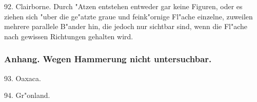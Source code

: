 \documentclass[a4paper, 11pt, oneside, polutonikogreek, german]{article}
\begin{document}
92. Clairborne. Durch "Atzen entstehen entweder gar keine Figuren, oder es ziehen sich "uber die ge"atzte graue und feink"ornige Fl"ache einzelne, zuweilen mehrere parallele B"ander hin, die jedoch nur sichtbar sind, wenn die Fl"ache nach gewissen Richtungen gehalten wird.

\subsubsection{Anhang. Wegen Hammerung nicht untersuchbar.}
\hspace*{6mm}93. Oaxaca.

94. Gr"onland.
\clearpage
\end{document}
